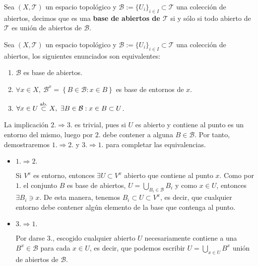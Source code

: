 \begin{defi}
Sea $(X, \mathcal{T})$ un espacio topológico y $\mathcal{B} :=\{U_i\}_{i\in I}\subset \mathcal{T}$ una colección de abiertos, decimos que es una \textbf{base de abiertos de $\mathcal{T}$} si y sólo si todo abierto de $\mathcal{T}$ es unión de abiertos de $\mathcal{B}$.
\end{defi}

\begin{prop}
Sea $(X, \mathcal{T})$ un espacio topológico y $\mathcal{B} :=\{U_i\}_{i\in I}\subset \mathcal{T}$ una colección de abiertos, los siguientes enunciados son equivalentes:
\begin{enumerate}
\item $\mathcal{B}$ es base de abiertos. 
\item $\forall x \in X, \ \mathcal{B}^x = \left\{ B \in \mathcal{B} : x \in B \right\}$ es base de entornos de $x$.
\item $\forall x \in U \stackrel{\text{ab.}}{\subset} X, \ \exists B \in \mathcal{B} : x \in B \subset U$.
\end{enumerate}
\end{prop}

\begin{demo}
La implicación $2. \Rightarrow 3.$ es trivial, pues si $U$ es abierto y contiene al punto es un entorno del mismo, luego por $2.$ debe contener a alguna $B\in \mathcal{B}$. Por tanto, demostraremos $1. \Rightarrow 2.$ y $3. \Rightarrow 1.$ para completar las equivalencias.
\begin{itemize}
\item $1. \Rightarrow 2.$

Si $V^x$ es entorno, entonces $\exists U \subset V^x$ abierto que contiene al punto $x$. Como por $1.$ el conjunto $B$ es base de abiertos, $U = \bigcup_{B_i \in \mathcal{B}} B_i$ y como $x\in U$, entonces $\exists B_i \ni x$. De esta manera, tenemos $B_i \subset U \subset V^x$, es decir, que cualquier entorno debe contener algún elemento de la base que contenga al punto.

\item $3. \Rightarrow 1.$

Por darse $3.$, escogido cualquier abierto $U$ necesariamente contiene a una $B^x\in \mathcal{B}$ para cada $x\in U$, es decir, que podemos escribir $U = \bigcup_{x \in U} B^x$ unión de abiertos de $\mathcal{B}$.
\end{itemize}
\end{demo}

